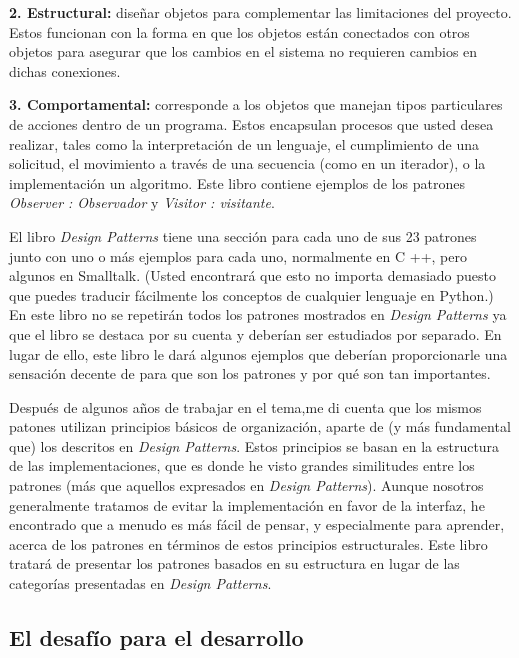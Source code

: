 \textbf{2. Estructural:} diseñar objetos para complementar las limitaciones del proyecto. Estos funcionan con la forma en que los objetos están conectados con otros objetos para asegurar que los cambios en el sistema no requieren cambios en dichas conexiones.        \newline

\textbf{3. Comportamental:} corresponde a los objetos que manejan tipos particulares de acciones dentro de un programa. Estos encapsulan procesos que usted desea realizar, tales como la interpretación de un lenguaje, el cumplimiento de una solicitud, el movimiento a través de una secuencia (como en un iterador), o la implementación un algoritmo. Este libro contiene ejemplos de los patrones \textit{Observer : Observador} y \textit{Visitor : visitante}. \newline

El libro \textit{Design Patterns} tiene una sección para cada uno de sus 23 patrones junto con uno o más ejemplos para cada uno, normalmente en C ++, pero algunos en Smalltalk. (Usted encontrará que esto no importa demasiado puesto que puedes traducir fácilmente los conceptos de cualquier lenguaje en Python.) En este libro no se repetirán todos los patrones mostrados en \textit{Design Patterns} ya que el libro se destaca por su cuenta y deberían ser estudiados por separado. En lugar de ello, este libro le dará algunos ejemplos que deberían proporcionarle una sensación decente de para que son los patrones y por qué son tan importantes. \newline

Después de algunos años de trabajar en el tema,me di cuenta que los mismos patones utilizan principios básicos de organización, aparte de (y más fundamental que) los descritos en \textit{Design Patterns}. Estos principios se basan en la estructura de las implementaciones, que es donde he visto grandes similitudes entre los patrones (más que aquellos expresados en \textit{Design Patterns}). Aunque nosotros generalmente tratamos de evitar la implementación en favor de la interfaz, he encontrado que a menudo es más fácil de pensar, y especialmente para aprender, acerca de los patrones en términos de estos principios estructurales. Este libro tratará de presentar los patrones basados en su estructura en lugar de las categorías presentadas en \textit{Design Patterns}.         \newline

\subsection{El desafío para el desarrollo}


